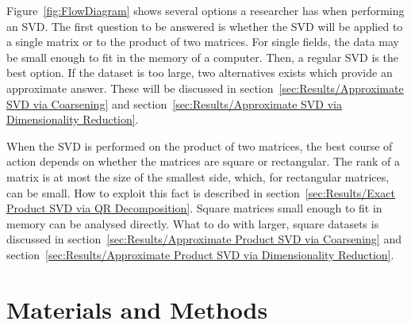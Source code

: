 \documentclass[ijgi,article,submit,moreauthors,pdftex,10pt,a4paper]{Definitions/mdpi}
\begin{document}
Figure~\ref{fig:FlowDiagram} shows several options a researcher has when performing an SVD. The first question to be answered is whether the SVD will be applied to a single matrix or to the product of two matrices. For single fields, the data may be small enough to fit in the memory of a computer. Then, a regular SVD is the best option. If the dataset is too large, two alternatives exists which provide an approximate answer. These will be discussed in section~\ref{sec:Results/Approximate SVD via Coarsening} and section~\ref{sec:Results/Approximate SVD via Dimensionality Reduction}.

When the SVD is performed on the product of two matrices, the best course of action depends on whether the matrices are square or rectangular. The rank of a matrix is at most the size of the smallest side, which, for rectangular matrices, can be small. How to exploit this fact is described in section~\ref{sec:Results/Exact Product SVD via QR Decomposition}. Square matrices small enough to fit in memory can be analysed directly. What to do with larger, square datasets is discussed in section~\ref{sec:Results/Approximate Product SVD via Coarsening} and section~\ref{sec:Results/Approximate Product SVD via Dimensionality Reduction}.

\section{Materials and Methods}
\label{sec:Materials and Methods}


\end{document}

